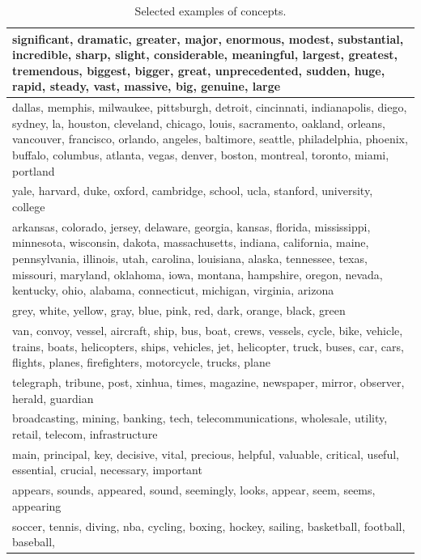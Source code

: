 \documentclass{kais}
\begin{document}
\begin{table}
\caption{Selected examples of concepts.}
\begin{center}
\renewcommand{\arraystretch}{1.3}
\begin{tabular*}{\textwidth}{p{\textwidth-0.3cm}}
\hline
significant, dramatic, greater, major, enormous, modest, substantial, incredible, sharp, slight, 
considerable, meaningful, largest, greatest, tremendous, biggest, bigger, great, unprecedented, 
sudden, huge, rapid, steady, vast, massive, big, genuine, large \\
\hline
dallas, memphis, milwaukee, pittsburgh, detroit, cincinnati, indianapolis, diego, sydney, la, 
houston, cleveland, chicago, louis, sacramento, oakland, orleans, vancouver, francisco, 
orlando, angeles, baltimore, seattle, philadelphia, phoenix, buffalo, columbus, atlanta, vegas, denver, boston, montreal, toronto, miami, portland\\
\hline
yale, harvard, duke, oxford, cambridge, school, ucla, stanford, university, college \\
\hline
arkansas, colorado, jersey, delaware, georgia, kansas, florida, mississippi, minnesota, 
wisconsin, dakota, massachusetts, indiana, california, maine, pennsylvania, illinois, utah, 
carolina, louisiana, alaska, tennessee, texas, missouri, maryland, oklahoma, iowa, 
montana, hampshire, oregon, nevada, kentucky, ohio, alabama, connecticut, michigan, virginia, arizona\\
\hline
grey, white, yellow, gray, blue, pink, red, dark, orange, black, green\\ 
\hline
van, convoy, vessel, aircraft, ship, bus, boat, crews, vessels, cycle, bike, vehicle, trains, 
boats, helicopters, ships, vehicles, jet, helicopter, truck, buses, car, cars, flights, planes, 
firefighters, motorcycle, trucks, plane\\ 
\hline
telegraph, tribune, post, xinhua, times, magazine, newspaper, mirror, observer, herald, 
guardian\\
\hline
broadcasting, mining, banking, tech, telecommunications, wholesale, utility, retail,
 telecom, infrastructure\\ 
\hline
main, principal, key, decisive, vital, precious, helpful, valuable, critical, useful, essential, 
crucial, necessary, important\\ 
\hline
appears, sounds, appeared, sound, seemingly, looks, appear, seem, seems, appearing\\ 
\hline
soccer, tennis, diving, nba, cycling, boxing, hockey, sailing, basketball, football, baseball, 

\end{tabular*}
\end{center}
\end{table}
\end{document}
